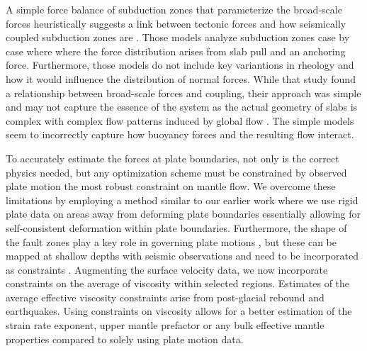 \documentclass[12pt]{article}
\begin{document}
A simple force balance of subduction zones that parameterize the broad-scale forces heuristically suggests a link between tectonic forces and how seismically coupled subduction zones are \citep{scholz1995mechanism, scholz2012seismic}. Those models analyze subduction zones  case by case where where the force distribution arises from slab pull and an anchoring force. Furthermore, those models do not include key variantions in rheology and how it would influence the distribution of  normal forces.  While that study found a relationship between broad-scale forces and coupling, their approach was simple and may not capture the essence of the system as the actual geometry of slabs is complex with complex flow patterns induced by global flow \citep{scholz2012seismic}. The simple models seem to incorrectly capture how buoyancy forces and the resulting flow interact.


  To accurately estimate the forces at plate boundaries, not only is the correct physics needed, but any optimization scheme must be constrained by observed plate motion \citep{BursteddeStadlerAlisicEtAl13,Stadler27082010} the most robust constraint on mantle flow. We overcome these limitations by employing a method similar to our earlier work \citep{ratnaswamy2015adjoint} where we use rigid plate data on areas away from deforming plate boundaries essentially allowing for self-consistent deformation within plate boundaries. Furthermore, the shape of the fault zones play a key role in governing plate motions \citep{Zhong10021995}, but these can be mapped at shallow depths with seismic observations and need to be incorporated as constraints \citep{Hayes2012}.
Augmenting the surface velocity data, we now incorporate constraints on the average of viscosity within selected regions. Estimates of the average effective viscosity constraints arise from post-glacial rebound and earthquakes.  Using constraints on viscosity allows for a better estimation of the strain rate exponent, upper mantle prefactor or any bulk effective mantle properties compared to solely using plate motion data. 
\end{document}

